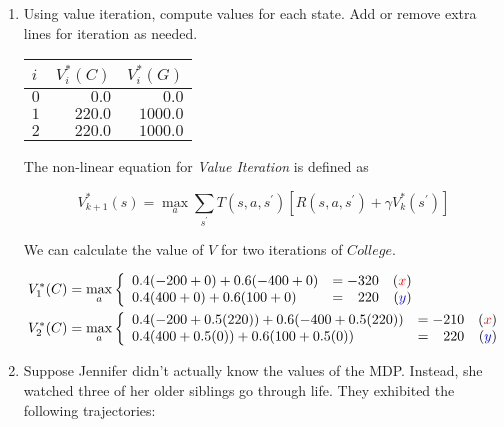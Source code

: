 \documentclass[12pt]{article}
\begin{document}
\begin{enumerate}

\item Using value iteration, compute values for each state.  Add or
  remove extra lines for iteration as needed.

\begin{center}
\begin{tabular}{|l|r|r|} \hline
$i$ & $V_i^*(C)$ & $V_i^*(G)$ \\ \hline
$0$ &$0.0$ &$0.0$ \\ 
$1$ & $220.0$ & $1000.0$\\ 
$2$ & $220.0$ & $1000.0$\\ 
\hline
\end{tabular}
\end{center}

The non-linear equation for {\em Value Iteration} is defined as

\[
  V^{*}_{k+1}(s) = \max_{a}\sum_{s^{\prime}}T(s, a, s^{\prime})\left[ R(s, a, s^{\prime}) + \gamma V^{*}_{k}(s^{\prime})\right]
\]

We can calculate the value of $V$ for two iterations of $College$.

\begin{align*}
V_{1}^{*}(C) &= \max_{a}\left\{ \begin{array}{lcr@{}}
                                  0.4(-200 + 0) + 0.6(-400 + 0) & = -320 & ({\color{red}{x}})\\
                                  0.4(400 + 0) + 0.6(100 + 0) & = \phantom{-}220 & ({\color{blue}{y}})\\
                                \end{array}\right.\\
V_{2}^{*}(C) &= \max_{a}\left\{ \begin{array}{lcr@{}}
                                  0.4(-200 + 0.5(220)) + 0.6(-400 + 0.5(220)) & = -210& ({\color{red}{x}})\\
                                  0.4(400 + 0.5(0)) + 0.6(100 + 0.5(0)) & = \phantom{-}220 & ({\color{blue}{y}})\\
                                \end{array}\right.
\end{align*}

\item Suppose Jennifer didn't actually know the values of the MDP.
  Instead, she watched three of her older siblings go through life.
  They exhibited the following trajectories:


\end{enumerate}
\end{document}
